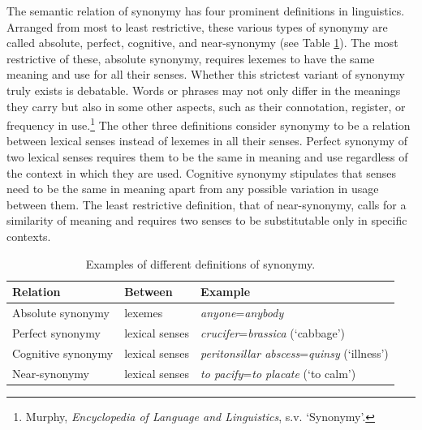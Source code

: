 The semantic relation of synonymy has four prominent definitions in linguistics. Arranged from most to least restrictive, these various types of synonymy are called absolute, perfect, cognitive, and near-synonymy (see Table \ref{table:Stolk_thes-content:synonymy-def}). The most restrictive of these, absolute synonymy, requires lexemes to have the same meaning and use for all their senses. Whether this strictest variant of synonymy truly exists is debatable. Words or phrases may not only differ in the meanings they carry but also in some other aspects, such as their connotation, register, or frequency in use.\footnote{Murphy, \textit{Encyclopedia of Language and Linguistics}, %
s.v. `Synonymy'.} The other three definitions consider synonymy to be a relation between lexical senses instead of lexemes in all their senses. Perfect synonymy of two lexical senses requires them to be the same in meaning and use regardless of the context in which they are used. Cognitive synonymy stipulates that senses need to be the same in meaning apart from any possible variation in usage between them. The least restrictive definition, that of near-synonymy, calls for a similarity of meaning and requires two senses to be substitutable only in specific contexts. 

\begin{table}[h!]
    \centering
    \small
    { \RaggedRight
    \begin{tabular}{lll}
    \toprule
        \textbf{Relation} & \textbf{Between} & \textbf{Example} \\
    \midrule
Absolute synonymy  & lexemes  & \textit{anyone}=\textit{anybody} \\
Perfect synonymy   & lexical senses & \textit{crucifer}=\textit{brassica} (`cabbage') \\
Cognitive synonymy & lexical senses & \textit{peritonsillar abscess}=\textit{quinsy} (`illness') \\
Near-synonymy      & lexical senses & \textit{to pacify}=\textit{to placate} (`to calm') \\
    \midrule
    \end{tabular}
    }
    \caption[]{\label{table:Stolk_thes-content:synonymy-def}Examples of different definitions of synonymy.\protect\footnotemark}
\end{table}

